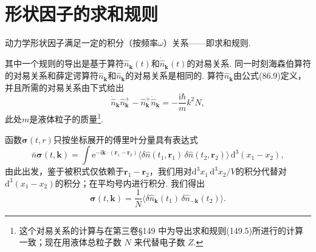 \section{形状因子的求和规则}

动力学形状因子满足一定的积分（按频率$\omega$）关系——即求和规则.

其中一个规则的导出是基于算符$\hat{n}_{\bm{k}}(t)$和$\dot{\hat{n}}_{\bm{k}}(t)$的对易关系. 同一时刻海森伯算符的对易关系和薛定谔算符$\hat{n}_{\bm{k}}$和$\dot{\hat{n}}_{\bm{k}}$的对易关系是相同的. 算符$\hat{n}_{\bm{k}}$由公式(86.9)定义，并且所需的对易关系由下式给出
\begin{equation}
\dot{\hat{n}}_{\bm{k}}\hat{n}^{+}_{\bm{k}}-\hat{n}^{+}_{\bm{k}}\dot{\hat{n}}_{\bm{k}}=-\frac{\mathrm{i}\hbar}{m}k^{2}N,
\end{equation}
此处$m$是液体粒子的质量\footnote{这个对易关系的计算与在第三卷§149 中为导出求和规则(149.5)所进行的计算一致；现在用液体总粒子数 $N$ 来代替电子数 $Z$.}.

函数$\bm{\sigma}(t,r)$只按坐标展开的傅里叶分量具有表达式
\begin{equation*}
\bar{n}\bm{\sigma}(t,\bm{k})=\int\mathrm{e}^{-\mathrm{i}\bm{k}\cdot(\bm{r}_{1}-\bm{r}_{2})}\bigl\langle\delta\hat{n}(t_{1},\bm{r}_{1})\,\delta\hat{n}(t_{2},\bm{r}_{2})\bigr\rangle\,\mathrm{d}^{3}(x_{1}-x_{2}),
\end{equation*}
由此出发，鉴于被积式仅依赖于$\bm{r}_{1}-\bm{r}_{2}$，我们用对$\mathrm{d}^{3}x_{1}\,\mathrm{d}^{3}x_{2}/V$的积分代替对$\mathrm{d}^{3}(x_{1}-x_{2})$的积分；在平均号内进行积分. 我们得出
\begin{equation}
\bm{\sigma}(t,\bm{k})=\frac{1}{N}\bigl\langle\delta\hat{n}_{\bm{k}}(t_{1})\,\delta\hat{n}_{-\bm{k}}(t_{2})\bigr\rangle.
\end{equation}

